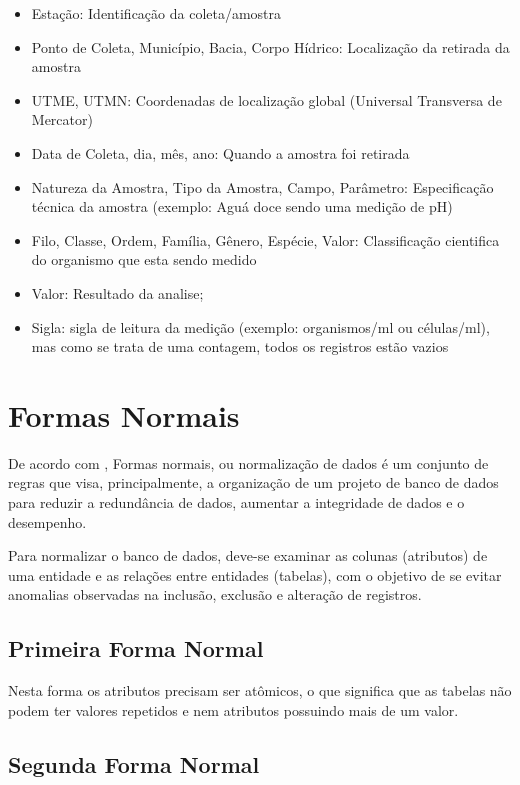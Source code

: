 \begin{itemize}
\singlespacing
\item   Estação: Identificação da coleta/amostra
\item   Ponto de Coleta, Município, Bacia, Corpo Hídrico: Localização da retirada da amostra
\item   UTME, UTMN: Coordenadas de localização global (Universal Transversa de Mercator)
\item   Data de Coleta, dia, mês, ano: Quando a amostra foi retirada
\item   Natureza da Amostra, Tipo da Amostra, Campo, Parâmetro: Especificação técnica da amostra (exemplo: Aguá doce sendo uma medição de pH)
\item   Filo, Classe, Ordem, Família, Gênero, Espécie, Valor: Classificação cientifica do organismo que esta sendo medido
\item   Valor: Resultado da analise;
\item   Sigla: sigla de leitura da medição (exemplo: organismos/ml ou células/ml), mas como se trata de uma contagem, todos os registros estão vazios
\end{itemize}

\section{Formas Normais}

De acordo com \cite{wkent}, Formas normais, ou normalização de dados é um conjunto de regras que visa, principalmente, a organização de um projeto de banco de dados para reduzir a redundância de dados, aumentar a integridade de dados e o desempenho.

Para normalizar o banco de dados, deve-se examinar as colunas (atributos) de uma entidade e as relações entre entidades (tabelas), com o objetivo de se evitar anomalias observadas na inclusão, exclusão e alteração de registros.

\subsection{Primeira Forma Normal}

Nesta forma os atributos precisam ser atômicos, o que significa que as tabelas não podem ter valores repetidos e nem atributos possuindo mais de um valor.

\subsection{Segunda Forma Normal}

